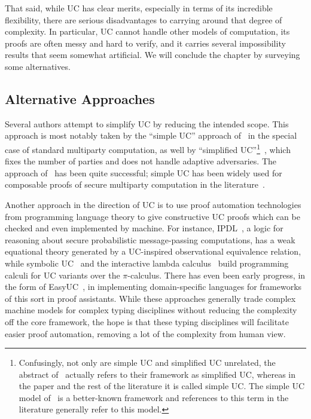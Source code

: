 That said, while UC has clear merits, especially in terms of its incredible
flexibility, there are serious disadvantages to carrying around that degree of
complexity. In particular, UC cannot handle other models of computation, its
proofs are often messy and hard to verify, and it carries several
impossibility results that seem somewhat artificial. We will conclude the
chapter by surveying some alternatives.

\subsection{Alternative Approaches}
\label{sec:alternatives}

Several authors attempt to simplify UC by reducing the intended scope. This
approach is most notably taken by the ``simple UC'' approach of~\cite{ccl-2015}
in the special case of standard multiparty computation, as well by ``simplified
UC''\footnote{
  Confusingly, not only are simple UC and simplified UC unrelated, the abstract
  of~\cite{ccl-2015} actually refers to their framework as simplified UC,
  whereas in the paper and the rest of the literature it is called simple UC.
  The simple UC model of~\cite{ccl-2015} is a better-known
framework and references to this term in the literature generally refer to this
model.}~\cite{wikstr-2016}, which fixes the number of parties and does not handle
adaptive adversaries. The approach of~\cite{ccl-2015} has been quite successful;
simple UC has been widely used for composable proofs of secure multiparty computation
in the literature~\cite{mansy-2019,hazay-2020,lindell-2022,scheffler-2023}.

Another approach in the direction of UC is to use proof automation technologies
from programming language theory to give constructive UC proofs which can be
checked and even implemented by machine. For instance,
IPDL~\cite{morisett-et-al-2021}, a logic for reasoning about secure
probabilistic message-passing computations, has a weak equational theory
generated by a UC-inspired observational equivalence relation, while symbolic
UC~\cite{bohl-unruh-2013} and the interactive lambda
calculus~\cite{liao-et-al-2019} build programming calculi for UC variants over
the $\pi$-calculus. There has even been early progress, in the form of
EasyUC~\cite{canetti-et-al-2019}, in implementing domain-specific languages for
frameworks of this sort in proof assistants. While these approaches generally
trade complex machine models for complex typing disciplines without reducing the
complexity off the core framework, the hope is that these typing disciplines
will facilitate easier proof automation, removing a lot of the complexity from
human view.

